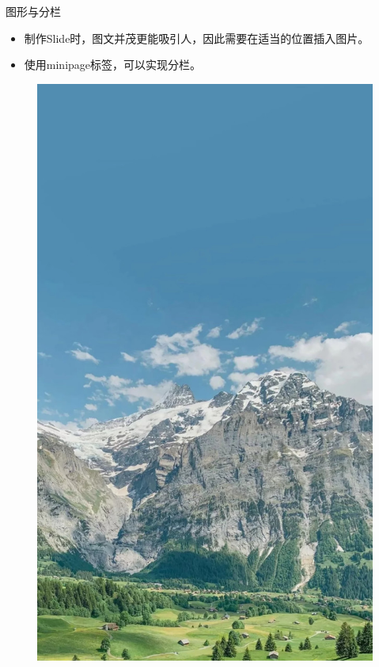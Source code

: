 \documentclass{beamer}
\begin{document}
\begin{frame}{图形与分栏}
    \begin{minipage}[c]{0.6\linewidth}
    	\begin{itemize}
    		\item 制作Slide时，图文并茂更能吸引人，因此需要在适当的位置插入图片。
    		\item 使用minipage标签，可以实现分栏。
    	\end{itemize}
    \end{minipage}  
    \begin{minipage}{0.3\linewidth}
        \medskip
        \begin{figure}[h]
            \centering
            \includegraphics[height=.7\textheight]{pic/landscape.jpeg}
        \end{figure}
    \end{minipage}
\end{frame}
\end{document}
